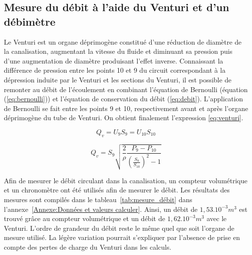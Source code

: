 \documentclass[12pt, a4paper, twoside]{article} %
\begin{document}
\subsection{Mesure du débit à l'aide du Venturi et d'un débimètre}

Le Venturi est un organe déprimogène constitué d'une réduction de diamètre de la canalisation, augmentant la vitesse du fluide et diminuant sa pression puis d'une augmentation de diamètre produisant l'effet inverse. Connaissant la différence de pression entre les points 10 et 9 du circuit correspondant à la dépression induite par le Venturi et les sections du Venturi, il est possible de remonter au débit de l'écoulement en combinant l'équation de Bernoulli (équation (\ref{eq:bernoulli})) et l'équation de conservation du débit (\ref{eq:debit}). L'application de Bernoulli se fait entre les points 9 et 10, respectivement avant et après l'organe déprimogène du tube de Venturi. On obtient finalement l'expression \ref{eq:venturi}.

\begin{equation}
   Q_{v} = U_9S_9 = U_{10}S_{10}
    \label{eq:debit}
\end{equation}

\begin{equation}
   Q_{v} = S_9\sqrt{\frac{2}{\rho}\frac{P_9 - P_{10}}{(\frac{S_9}{S_{10}})^2-1}}
    \label{eq:venturi}
\end{equation}

Afin de mesurer le débit circulant dans la canalisation, un compteur volumétrique et un chronomètre ont été utilisés afin de mesurer le débit. Les résultats des mesures sont compilés dans le tableau~\ref{tab:mesure_débit} dans l'annexe~\ref{Annexe:Données et valeurs calculer}. 
Ainsi, un débit de $1,53.10^{-3} m^3$ est trouvé grâce au compteur volumétrique et un débit de $1,62.10^{-3} m^3$ avec le Venturi.
L'ordre de grandeur du débit reste le même quel que soit l'organe de mesure utilisé. La légère variation pourrait s'expliquer par l'absence de prise en compte des pertes de charge du Venturi dans les calculs.
\end{document}
